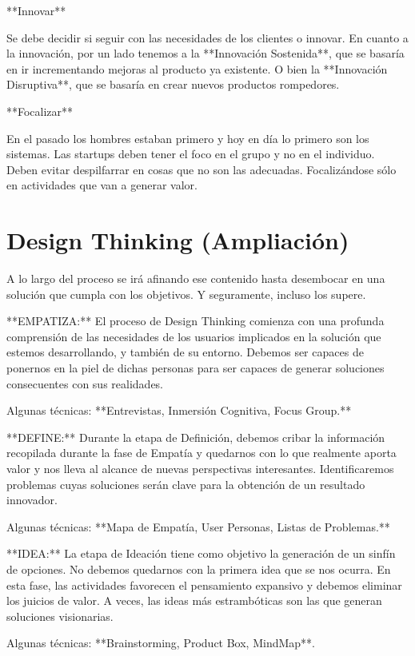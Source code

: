 \documentclass[12pt,twoside,titlepage]{report}
\begin{document}
**Innovar**

Se debe decidir si seguir con las necesidades de los clientes o innovar. En cuanto a la innovación, por un lado tenemos a la **Innovación Sostenida**, que se basaría en ir incrementando mejoras al producto ya existente. O bien la **Innovación Disruptiva**, que se basaría en crear nuevos productos rompedores.

**Focalizar**

En el pasado los hombres estaban primero y hoy en día lo primero son los sistemas. Las startups deben tener el foco en el grupo y no en el individuo. Deben evitar despilfarrar en cosas que no son las adecuadas. Focalizándose sólo en actividades que van a generar valor.

\section{Design Thinking (Ampliación)}

A lo largo del proceso se irá afinando ese contenido hasta desembocar en una solución que cumpla con los objetivos. Y seguramente, incluso los supere.

**EMPATIZA:** El proceso de Design Thinking comienza con una profunda comprensión de las necesidades de los usuarios implicados en la solución que estemos desarrollando, y también de su entorno. Debemos ser capaces de ponernos en la piel de dichas personas para ser capaces de generar soluciones consecuentes con sus realidades.

Algunas técnicas: **Entrevistas, Inmersión Cognitiva, Focus Group.**

**DEFINE:** Durante la etapa de Definición, debemos cribar la información recopilada durante la fase de Empatía y quedarnos con lo que realmente aporta valor y nos lleva al alcance de nuevas perspectivas interesantes. Identificaremos problemas cuyas soluciones serán clave para la obtención de un resultado innovador.

Algunas técnicas: **Mapa de Empatía, User Personas, Listas de Problemas.**

**IDEA:** La etapa de Ideación tiene como objetivo la generación de un sinfín de opciones. No debemos quedarnos con la primera idea que se nos ocurra. En esta fase, las actividades favorecen el pensamiento expansivo y debemos eliminar los juicios de valor. A veces, las ideas más estrambóticas son las que generan soluciones visionarias.

Algunas técnicas: **Brainstorming, Product Box, MindMap**.
\end{document}
